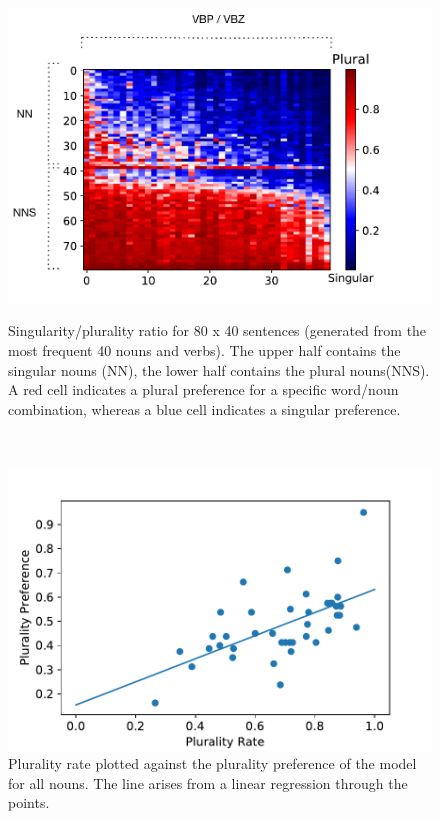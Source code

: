  
    \begin{figure}
    \centering
        \includegraphics[scale=0.5]{matrix_plot_ratio.pdf}
        \label{fig:matrix_ratio}
        \caption{Singularity/plurality ratio for 80 x 40 sentences (generated from the most frequent 40 nouns and verbs). The upper half contains the singular nouns (NN), the lower half contains the plural nouns(NNS). A red cell indicates a plural preference for a specific word/noun combination, whereas a blue cell indicates a singular preference. }
    \end{figure}
    ~ %
     \begin{figure}
     \centering
        \includegraphics[scale=0.5]{lin_reg.pdf}
        \caption{Plurality rate plotted against the plurality preference of the model for all nouns. The line arises from a linear regression through the points. }
        \label{fig:lin_reg}
    \end{figure}
